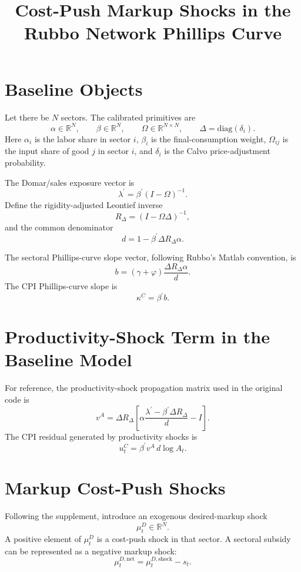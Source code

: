 \documentclass[11pt]{article}
\title{Cost-Push Markup Shocks in the Rubbo Network Phillips Curve}
\author{}
\date{}
\begin{document}
\maketitle

\section{Baseline Objects}

Let there be $N$ sectors. The calibrated primitives are
\[
    \alpha \in \mathbb{R}^{N}, \qquad
    \beta \in \mathbb{R}^{N}, \qquad
    \Omega \in \mathbb{R}^{N \times N}, \qquad
    \Delta = \mathrm{diag}(\delta_i).
\]
Here $\alpha_i$ is the labor share in sector $i$, $\beta_i$ is the final-consumption
weight, $\Omega_{ij}$ is the input share of good $j$ in sector $i$, and $\delta_i$
is the Calvo price-adjustment probability.

The Domar/sales exposure vector is
\[
    \lambda^\prime
    =
    \beta^\prime (I-\Omega)^{-1}.
\]
Define the rigidity-adjusted Leontief inverse
\[
    R_\Delta = (I-\Omega\Delta)^{-1},
\]
and the common denominator
\[
    d
    =
    1 - \beta^\prime \Delta R_\Delta \alpha.
\]

The sectoral Phillips-curve slope vector, following Rubbo's Matlab convention,
is
\[
    b
    =
    (\gamma+\varphi)
    \frac{\Delta R_\Delta \alpha}{d}.
\]
The CPI Phillips-curve slope is
\[
    \kappa^C = \beta^\prime b.
\]

\section{Productivity-Shock Term in the Baseline Model}

For reference, the productivity-shock propagation matrix used in the original code is
\[
    v^A
    =
    \Delta R_\Delta
    \left[
        \alpha
        \frac{\lambda^\prime - \beta^\prime \Delta R_\Delta}{d}
        - I
    \right].
\]
The CPI residual generated by productivity shocks is
\[
    u^C_t = \beta^\prime v^A \, d\log A_t.
\]

\section{Markup Cost-Push Shocks}

Following the supplement, introduce an exogenous desired-markup shock
\[
    \mu_t^D \in \mathbb{R}^{N}.
\]
A positive element of $\mu_t^D$ is a cost-push shock in that sector. A sectoral
subsidy can be represented as a negative markup shock:
\[
    \mu^{D,\mathrm{net}}_t
    =
    \mu^{D,\mathrm{shock}}_t
    -
    s_t.
\]
\end{document}
